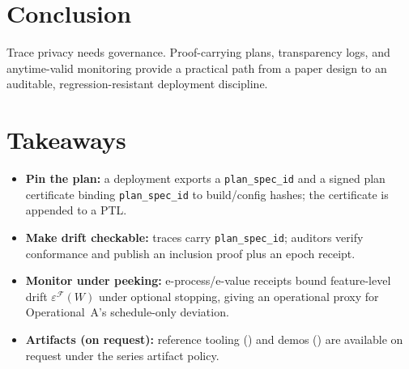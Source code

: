 \documentclass[11pt]{article}
\begin{document}
\section{Conclusion}
Trace privacy needs governance.
Proof-carrying plans, transparency logs, and anytime-valid monitoring provide a practical path
from a paper design to an auditable, regression-resistant deployment discipline.

\section{Takeaways}
\begin{itemize}[leftmargin=*]
  \item \textbf{Pin the plan:} a deployment exports a \texttt{plan\_spec\_id} and a signed plan certificate binding \texttt{plan\_spec\_id} to build/config hashes; the certificate is appended to a PTL.
  \item \textbf{Make drift checkable:} traces carry \texttt{plan\_spec\_id}; auditors verify conformance and publish an inclusion proof plus an epoch receipt.
  \item \textbf{Monitor under peeking:} e-process/e-value receipts bound feature-level drift $\varepsilon^{\mathcal{F}}(W)$ under optional stopping, giving an operational proxy for Operational~A's schedule-only deviation.
  \item \textbf{Artifacts (on request):} reference tooling () and demos () are available on request under the series artifact policy.\cite{series:artifactpolicy}
\end{itemize}
\end{document}
